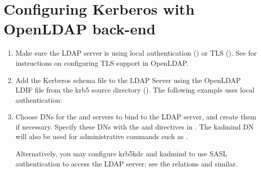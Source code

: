 \documentclass[letterpaper,10pt,english]{sphinxmanual}
\begin{document}
\chapter{Configuring Kerberos with OpenLDAP back-end}
\label{\detokenize{admin/conf_ldap:conf-ldap}}\label{\detokenize{admin/conf_ldap::doc}}\label{\detokenize{admin/conf_ldap:configuring-kerberos-with-openldap-back-end}}\begin{enumerate}
\item {} 
Make sure the LDAP server is using local authentication
() or TLS ().  See
 for instructions on
configuring TLS support in OpenLDAP.

\item {} 
Add the Kerberos schema file to the LDAP Server using the OpenLDAP
LDIF file from the krb5 source directory
().
The following example uses local authentication:

%
\begin{sphinxVerbatim}[commandchars=\\\{\}]
      
\end{sphinxVerbatim}

\item {} 
Choose DNs for the {\hyperref[\detokenize{admin/admin_commands/krb5kdc:krb5kdc-8}]{}} and {\hyperref[\detokenize{admin/admin_commands/kadmind:kadmind-8}]{}} servers
to bind to the LDAP server, and create them if necessary.  Specify
these DNs with the  and 
directives in {\hyperref[\detokenize{admin/conf_files/kdc_conf:kdc-conf-5}]{}}.  The kadmind DN will also be
used for administrative commands such as {\hyperref[\detokenize{admin/admin_commands/kdb5_util:kdb5-util-8}]{}}.

Alternatively, you may configure krb5kdc and kadmind to use SASL
authentication to access the LDAP server; see the {\hyperref[\detokenize{admin/conf_files/kdc_conf:dbmodules}]{}}
relations  and similar.


\end{enumerate}
\end{document}
